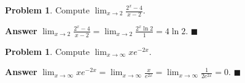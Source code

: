 \documentclass[12pt,letterpaper]{book}
\numberwithin{equation}{section}
\theoremstyle{definition}
\newtheorem{problem}[thm]{\textbf{Problem}}
\newenvironment{answer}{\noindent\textbf{Answer}}{\hfill$\blacksquare$\vspace{0.1in}}
\begin{document}
\begin{problem}
Compute $\displaystyle{\lim_{x\to 2} \frac{2^x-4}{x-2}}$.
\end{problem}

\begin{answer}
$\displaystyle{\lim_{x\to 2} \frac{2^x-4}{x-2}=\lim_{x\to 2} \frac{2^x\ln 2}{1}=4\ln 2}$.
\end{answer}

\begin{problem}
Compute $\displaystyle{\lim_{x\to \infty} xe^{-2x}}$.
\end{problem}

\begin{answer}
$\displaystyle{\lim_{x\to \infty} xe^{-2x}=\lim_{x\to \infty} \frac{x}{e^{2x}}=\lim_{x\to \infty} \frac{1}{2e^{2x}}=0}$.
\end{answer}
\end{document}
